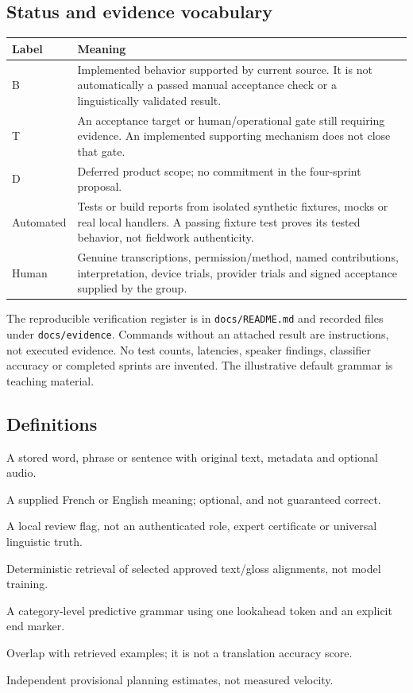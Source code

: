 \documentclass[11pt,a4paper]{article}
\begin{document}
\subsection{Status and evidence vocabulary}
\begin{longtable}{L{2.2cm}L{12.3cm}}
\toprule\textbf{Label} & \textbf{Meaning}\\\midrule\endhead
B & Implemented behavior supported by current source. It is not automatically a passed manual acceptance check or a linguistically validated result.\\
T & An acceptance target or human/operational gate still requiring evidence. An implemented supporting mechanism does not close that gate.\\
D & Deferred product scope; no commitment in the four-sprint proposal.\\
Automated & Tests or build reports from isolated synthetic fixtures, mocks or real local handlers. A passing fixture test proves its tested behavior, not fieldwork authenticity.\\
Human & Genuine transcriptions, permission/method, named contributions, interpretation, device trials, provider trials and signed acceptance supplied by the group.\\
\bottomrule
\end{longtable}
The reproducible verification register is in \nolinkurl{docs/README.md} and
recorded files under \nolinkurl{docs/evidence}. Commands without an
attached result are instructions, not executed evidence. No test counts,
latencies, speaker findings, classifier accuracy or completed sprints are
invented. The illustrative default grammar is teaching material.

\subsection{Definitions}
\begin{description}[style=nextline]
\item[Entry] A stored word, phrase or sentence with original text, metadata and optional audio.
\item[Gloss] A supplied French or English meaning; optional, and not guaranteed correct.
\item[Approved] A local review flag, not an authenticated role, expert certificate or universal linguistic truth.
\item[Grounding] Deterministic retrieval of selected approved text/gloss alignments, not model training.
\item[LL(1)] A category-level predictive grammar using one lookahead token and an explicit end marker.
\item[Evidence coverage] Overlap with retrieved examples; it is not a translation accuracy score.
\item[Story point / task hour] Independent provisional planning estimates, not measured velocity.
\end{description}
\end{document}
